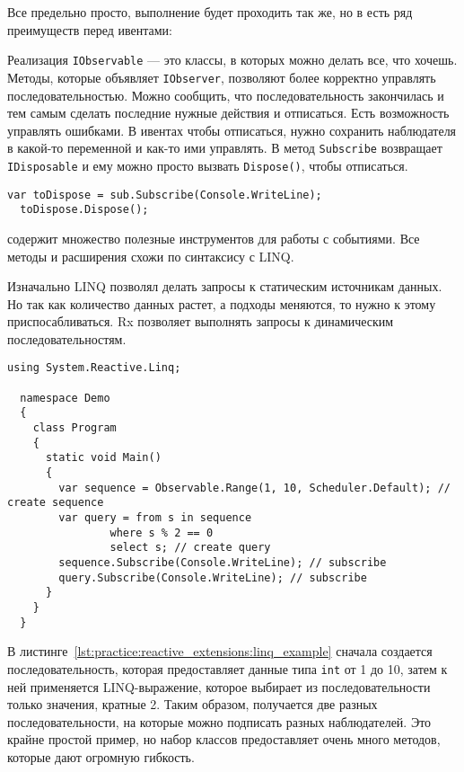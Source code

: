 Все предельно просто, выполнение будет проходить так же, но в \rx{} есть ряд преимуществ перед ивентами:

Реализация \lstinline[style=csharpinlinestyle]!IObservable! --- это классы, в которых можно делать все, что хочешь. Методы, которые объявляет \lstinline[style=csharpinlinestyle]!IObserver!,
позволяют более корректно управлять последовательностью. Можно сообщить, что последовательность закончилась и тем самым сделать последние нужные действия и отписаться.
Есть возможность управлять ошибками. В ивентах чтобы отписаться, нужно сохранить наблюдателя в какой-то переменной и как-то ими управлять.
В \rx{} метод \lstinline[style=csharpinlinestyle]!Subscribe! возвращает \lstinline[style=csharpinlinestyle]!IDisposable! и ему можно просто вызвать \lstinline[style=csharpinlinestyle]!Dispose()!, чтобы отписаться.

\begin{lstlisting}[style=csharpinlinestyle, caption={Отписка от события}, label=lst:practice:reactive_extensions:dispose_example]
  var toDispose = sub.Subscribe(Console.WriteLine);
  toDispose.Dispose();
\end{lstlisting}

\rx{} содержит множество полезные инструментов для работы с событиями. Все методы и расширения схожи по синтаксису с LINQ.

Изначально LINQ позволял делать запросы к статическим источникам данных.
Но так как количество данных растет, а подходы меняются, то нужно к этому приспосабливаться. Rx позволяет выполнять запросы к динамическим последовательностям.

\begin{lstlisting}[style=csharpinlinestyle, caption={Пример использования LINQ}, label=lst:practice:reactive_extensions:linq_example]
  using System.Reactive.Linq;

  namespace Demo
  {
    class Program
    {
      static void Main()
      {
        var sequence = Observable.Range(1, 10, Scheduler.Default); // create sequence
        var query = from s in sequence
                where s % 2 == 0
                select s; // create query
        sequence.Subscribe(Console.WriteLine); // subscribe
        query.Subscribe(Console.WriteLine); // subscribe
      }
    }
  }
\end{lstlisting}

В листинге~\ref{lst:practice:reactive_extensions:linq_example} сначала создается последовательность, которая предоставляет данные типа \lstinline[style=csharpinlinestyle]!int! от 1 до 10,
затем к ней применяется LINQ-выражение, которое выбирает из последовательности только значения, кратные 2.
Таким образом, получается две разных последовательности, на которые можно подписать разных наблюдателей. Это крайне простой пример, но набор классов \rx{} предоставляет очень много методов, которые дают огромную гибкость.

